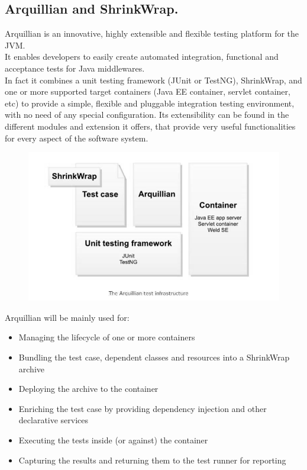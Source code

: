 \documentclass[18pt,oneside,a4paper, titlepage]{article}
\begin{document}
	\subsection{Arquillian and ShrinkWrap.}
		Arquillian is an innovative, highly extensible and flexible testing platform for the JVM.\\ It enables developers to easily create automated integration, functional and acceptance tests for Java middlewares. \\In fact it combines a unit testing framework (JUnit or TestNG), ShrinkWrap, and one or more supported target containers (Java EE container, servlet container, etc) to provide a simple, flexible and pluggable integration testing environment, with no need of any special configuration.
	\newpage
	\noindent
		Its extensibility can be found in the different modules and extension it offers, that provide very useful functionalities for every aspect of the software system.
		\vspace{0.5cm}
		\begin{figure}[h]
			\centering
			\includegraphics[scale=0.55]{Arquillian.jpg}
		\end{figure}
			
		\vspace{0.5cm}
	
		Arquillian will be mainly used for:
		\begin{itemize}
			\item Managing the lifecycle of one or more containers
			\item Bundling the test case, dependent classes and resources into a ShrinkWrap archive
			\item Deploying the archive to the container
			\item Enriching the test case by providing dependency injection and other declarative services
			\item Executing the tests inside (or against) the container
			\item Capturing the results and returning them to the test runner for reporting
		\end{itemize}
		
\end{document}
